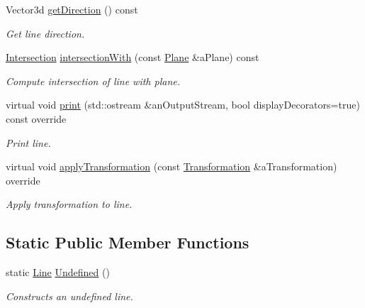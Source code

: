\begin{DoxyCompactItemize}
Vector3d \hyperlink{classlibrary_1_1math_1_1geom_1_1d3_1_1objects_1_1_line_aa108a53227e4326188fe17a03c55f9cb}{get\+Direction} () const
\begin{DoxyCompactList}\small\item\em Get line direction. \end{DoxyCompactList}\item 
\hyperlink{classlibrary_1_1math_1_1geom_1_1d3_1_1_intersection}{Intersection} \hyperlink{classlibrary_1_1math_1_1geom_1_1d3_1_1objects_1_1_line_a422b904b4ec38d753ab7eed5b214f45a}{intersection\+With} (const \hyperlink{classlibrary_1_1math_1_1geom_1_1d3_1_1objects_1_1_plane}{Plane} \&a\+Plane) const
\begin{DoxyCompactList}\small\item\em Compute intersection of line with plane. \end{DoxyCompactList}\item 
virtual void \hyperlink{classlibrary_1_1math_1_1geom_1_1d3_1_1objects_1_1_line_a6c2d2268fed2b9c461730fbcd4425d6e}{print} (std\+::ostream \&an\+Output\+Stream, bool display\+Decorators=true) const override
\begin{DoxyCompactList}\small\item\em Print line. \end{DoxyCompactList}\item 
virtual void \hyperlink{classlibrary_1_1math_1_1geom_1_1d3_1_1objects_1_1_line_ae485ab541cbd10113eac30d1956fb4c0}{apply\+Transformation} (const \hyperlink{classlibrary_1_1math_1_1geom_1_1d3_1_1_transformation}{Transformation} \&a\+Transformation) override
\begin{DoxyCompactList}\small\item\em Apply transformation to line. \end{DoxyCompactList}\end{DoxyCompactItemize}
\subsection*{Static Public Member Functions}
\begin{DoxyCompactItemize}
\item 
static \hyperlink{classlibrary_1_1math_1_1geom_1_1d3_1_1objects_1_1_line}{Line} \hyperlink{classlibrary_1_1math_1_1geom_1_1d3_1_1objects_1_1_line_a6e80b434196ee84bc74154532989c18c}{Undefined} ()
\begin{DoxyCompactList}\small\item\em Constructs an undefined line. \end{DoxyCompactList}\end{DoxyCompactItemize}


